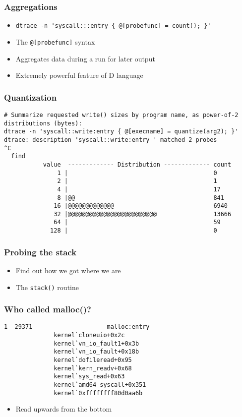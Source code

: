 \documentclass[pdftex]{beamer}
\begin{document}
\begin{frame}[fragile]
  \frametitle{Aggregations}
  \begin{itemize}
  \item \verb+dtrace -n 'syscall:::entry { @[probefunc] = count(); }'+
  \item The \verb+@[probefunc]+ syntax
  \item Aggregates data during a run for later output
  \item Extremely powerful feature of D language
  \end{itemize}
\end{frame}

\begin{frame}[fragile]
  \frametitle{Quantization}
\begin{lstlisting}
# Summarize requested write() sizes by program name, as power-of-2 distributions (bytes):
dtrace -n 'syscall::write:entry { @[execname] = quantize(arg2); }'
dtrace: description 'syscall::write:entry ' matched 2 probes
^C
  find                                              
           value  ------------- Distribution ------------- count    
               1 |                                         0        
               2 |                                         1        
               4 |                                         17       
               8 |@@                                       841      
              16 |@@@@@@@@@@@@@                            6940     
              32 |@@@@@@@@@@@@@@@@@@@@@@@@@                13666    
              64 |                                         59       
             128 |                                         0        
\end{lstlisting}
\end{frame}

\begin{frame}[fragile]
  \frametitle{Probing the stack}
  \begin{itemize}
  \item Find out how we got where we are
  \item The \verb+stack()+ routine
  \end{itemize}
\end{frame}

\begin{frame}[fragile]
  \frametitle{Who called malloc()?}
\begin{lstlisting}
1  29371                     malloc:entry 
              kernel`cloneuio+0x2c
              kernel`vn_io_fault1+0x3b
              kernel`vn_io_fault+0x18b
              kernel`dofileread+0x95
              kernel`kern_readv+0x68
              kernel`sys_read+0x63
              kernel`amd64_syscall+0x351
              kernel`0xffffffff80d0aa6b
\end{lstlisting}
  \begin{itemize}
  \item Read upwards from the bottom
  \end{itemize}
\end{frame}
\end{document}
